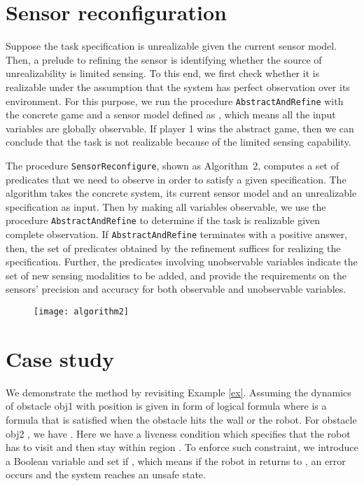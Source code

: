 \documentclass[letterpaper, 10 pt, conference]{ieeeconf}
\begin{document}
\section{Sensor reconfiguration}
\label{subsec:sensorconf}
Suppose the task specification is unrealizable given the current
sensor model. Then, a prelude to refining the sensor is identifying
whether the source of unrealizability is limited sensing. To this end,
we first check whether it is realizable under the assumption that the
system has perfect observation over its environment. For this purpose,
we run the procedure \texttt{AbstractAndRefine} with the concrete game
 and a sensor model defined as , which means all the input variables are globally
observable.  If player 1 wins the abstract game, then we can conclude
that the task is not realizable because of the limited sensing
capability.

The procedure \texttt{SensorReconfigure}, shown as Algorithm~2, computes
a set of predicates that we need to observe in order to
satisfy a given specification. The algorithm takes the concrete
system, its current sensor model and an unrealizable specification as
input. Then by making all variables observable, we use the procedure \texttt{AbstractAndRefine} to determine if the task is realizable given complete observation. If \texttt{AbstractAndRefine} terminates with a positive answer, then, the set of predicates obtained by the refinement suffices for realizing the specification. Further, the predicates involving
unobservable variables indicate the set of new sensing modalities to
be added, and provide the requirements on the sensors'
precision and accuracy for both observable and unobservable variables.

\vspace{-2ex}
\begin{figure}[ht]
\centering
\texttt{[image: algorithm2]}
\label{alg:sensor_reconfig}
\end{figure}
\vspace{-4ex}

\section{Case study}
\label{subsec:case}
We demonstrate the method by revisiting Example \ref{ex}. Assuming the
dynamics of obstacle obj1 with position  is given in form
of logical formula  where 
is a formula that is satisfied when the obstacle hits the wall or the
robot.  For obstacle obj2 , we have . Here we have a liveness condition which specifies that
the robot has to visit and then stay within region . To enforce
such constraint, we introduce a Boolean variable  and set  if , which means if the robot in 
returns to , an error occurs and the system reaches an unsafe
state.
\end{document}
